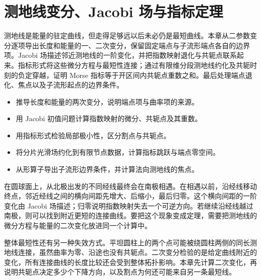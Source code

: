 
% 
% 

\chapter{测地线变分、Jacobi 场与指标定理}
\label{g3:ch:06}

\begin{chapterabstract}
	测地线是能量的驻定曲线，但走得足够远以后未必仍是最短曲线。本章从二参数变分逐项导出长度和能量的一、二次变分，保留固定端点与子流形端点各自的边界项。Jacobi 场描述邻近测地线的一阶变化，并把指数映射退化与共轭点联系起来。指标形式将这些微分方程与最短性连接；通过有限维分段测地线约化及共轭时刻的负定穿越，证明 Morse 指标等于开区间内共轭点重数之和。最后处理端点退化、焦点以及子流形起点的边界条件。
\end{chapterabstract}

\begin{learninggoals}
	\begin{itemize}
		\item 推导长度和能量的两次变分，说明端点项与曲率项的来源。
		\item 用 Jacobi 初值问题计算指数映射的微分、共轭点及其重数。
		\item 用指标形式检验局部极小性，区分割点与共轭点。
		\item 将分片光滑场约化到有限节点数据，计算指标跳跃与端点零空间。
		\item 从形算子导出子流形边界条件，并计算法向测地线的焦点。
	\end{itemize}
\end{learninggoals}

在圆球面上，从北极出发的不同经线最终会在南极相遇。在相遇以前，沿经线移动终点，邻近经线之间的横向间距先增大、后缩小，最后归零。这个横向间距的一阶变化由 Jacobi 场描述；归零说明指数映射失去一个可逆方向。若继续沿经线越过南极，则可以找到附近更短的连接曲线。要把这个现象变成定理，需要把测地线的微分方程与能量的二次变化放进同一个计算中。

\ProseParagraphBreak

整体最短性还有另一种失效方式。平坦圆柱上的两个点可能被绕圆柱两侧的同长测地线连接，虽然曲率为零、沿途也没有共轭点。二次变分检验的是给定曲线附近的变化，所有连接曲线的长度比较还会受到整体拓扑影响。本章先计算二次变化，再说明共轭点决定多少个下降方向，以及割点为何还可能来自另一条最短线。

